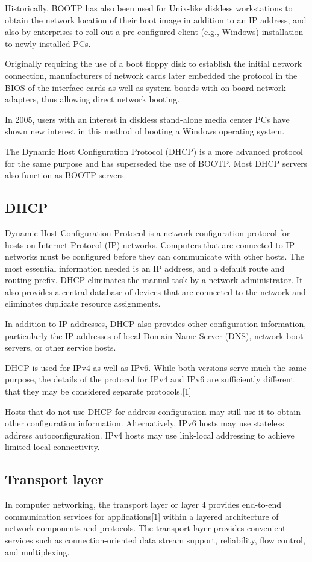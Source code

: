 \documentclass[a4paper,oneside]{report}
\begin{document}
	Historically, BOOTP has also been used for Unix-like diskless workstations to obtain the network location of their boot image in addition to an IP address, and also by enterprises to roll out a pre-configured client (e.g., Windows) installation to newly installed PCs.

	 Originally requiring the use of a boot floppy disk to establish the initial network connection, manufacturers of network cards later embedded the protocol in the BIOS of the interface cards as well as system boards with on-board network adapters, thus allowing direct network booting.

	 In 2005, users with an interest in diskless stand-alone media center PCs have shown new interest in this method of booting a Windows operating system.

 	The Dynamic Host Configuration Protocol (DHCP) is a more advanced protocol for the same purpose and has superseded the use of BOOTP. Most DHCP servers also function as BOOTP servers.
    	

	\subsection{DHCP}
	Dynamic Host Configuration Protocol  is a network configuration protocol for hosts on Internet Protocol (IP) networks. Computers that are connected to IP networks must be configured before they can communicate with other hosts. The most essential information needed is an IP address, and a default route and routing prefix. DHCP eliminates the manual task by a network administrator. It also provides a central database of devices that are connected to the network and eliminates duplicate resource assignments.

	  In addition to IP addresses, DHCP also provides other configuration information, particularly the IP addresses of local Domain Name Server (DNS), network boot servers, or other service hosts.

	 DHCP is used for IPv4 as well as IPv6. While both versions serve much the same purpose, the details of the protocol for IPv4 and IPv6 are sufficiently different that they may be considered separate protocols.[1]

	 Hosts that do not use DHCP for address configuration may still use it to obtain other configuration information. Alternatively, IPv6 hosts may use stateless address autoconfiguration. IPv4 hosts may use link-local addressing to achieve limited local connectivity.


    	\subsection{Transport layer}
	 In computer networking, the transport layer or layer 4 provides end-to-end communication services for applications[1] within a layered architecture of network components and protocols. The transport layer provides convenient services such as connection-oriented data stream support, reliability, flow control, and multiplexing.
	
\end{document}

